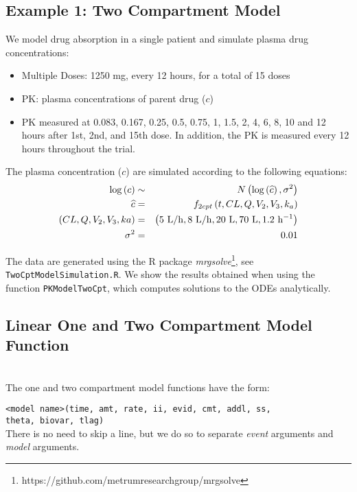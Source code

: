\documentclass[11pt]{amsart}
\begin{document}
\subsection{Example 1: Two Compartment Model}
We model drug absorption in a single patient and simulate plasma drug concentrations:
\begin{itemize}
  \item Multiple Doses: 1250 mg, every 12 hours, for a total of 15 doses
  \item PK: plasma concentrations of parent drug ($c$)
  \item PK measured at 0.083, 0.167, 0.25, 0.5, 0.75, 1, 1.5, 2, 4, 6, 8, 10 and 12 hours after 1st, 2nd, and 15th dose. In addition, the PK is measured every 12 hours throughout the trial.
\end{itemize}

The plasma concentration ($c$) are simulated according to the following equations:
\begin{eqnarray*}
\log\left(c\right) &\sim& N\left(\log\left(\widehat{c}\right),\sigma^2\right) \\
 \widehat{c} &=& f_{2cpt}\left(t, CL, Q, V_2, V_3, k_a\right) \\
  \left(CL, Q, V_2, V_3, ka\right) &=& 
	\left(5\ {\rm L/h}, 8\  {\rm L/h}, 20\  {\rm L},  70\ {\rm L}, 1.2\ {\rm h^{-1}} \right) \\
  \sigma^2 &=& 0.01
\end{eqnarray*}

The data are generated using the R package \textit{mrgsolve}\footnote{https://github.com/metrumresearchgroup/mrgsolve}, see \texttt{TwoCptModelSimulation.R}. We show the results obtained when using the function \texttt{PKModelTwoCpt}, which computes solutions to the ODEs analytically.

\subsection{Linear One and Two Compartment Model Function} \ \\

The one and two compartment model functions have the form:

\texttt{<model name>(time, amt, rate, ii, evid, cmt, addl, ss,\\
\phantom{<model name>} theta,  biovar, tlag)} \\

There is no need to skip a line, but we do so to separate \textit{event} arguments and \textit{model} arguments.
\end{document}
